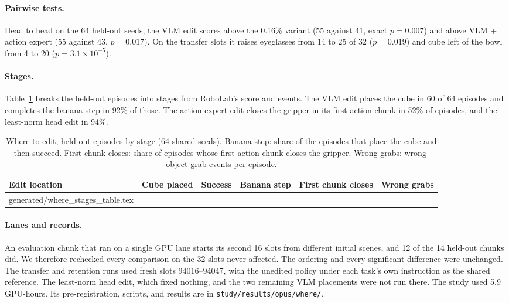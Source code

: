 \documentclass{article}
\makeatletter
\newcommand{\tabinput}[1]{\@@input #1 }
\makeatother
\begin{document}
\paragraph{Pairwise tests.} Head to head on the 64 held-out seeds, the VLM edit scores above the 0.16\% variant (55 against 41, exact $p=0.007$) and above VLM + action expert (55 against 43, $p=0.017$). On the transfer slots it raises eyeglasses from 14 to 25 of 32 ($p=0.019$) and cube left of the bowl from 4 to 20 ($p=3.1\times10^{-5}$).

\paragraph{Stages.} Table~\ref{tab:where-stages} breaks the held-out episodes into stages from RoboLab's score and events. The VLM edit places the cube in 60 of 64 episodes and completes the banana step in 92\% of those. The action-expert edit closes the gripper in its first action chunk in 52\% of episodes, and the least-norm head edit in 94\%.

\begin{table}[htbp]
\centering\small
\caption{Where to edit, held-out episodes by stage (64 shared seeds). Banana step: share of the episodes that place the cube and then succeed. First chunk closes: share of episodes whose first action chunk closes the gripper. Wrong grabs: wrong-object grab events per episode.}
\label{tab:where-stages}
\setlength{\tabcolsep}{4pt}
\begin{tabular}{@{}lrrrrr@{}}
\toprule
Edit location & Cube placed & Success & Banana step & First chunk closes & Wrong grabs\\
\midrule
\tabinput{generated/where_stages_table.tex}
\bottomrule
\end{tabular}
\end{table}

\paragraph{Lanes and records.} An evaluation chunk that ran on a single GPU lane starts its second 16 slots from different initial scenes, and 12 of the 14 held-out chunks did. We therefore rechecked every comparison on the 32 slots never affected. The ordering and every significant difference were unchanged. The transfer and retention runs used fresh slots 94016--94047, with the unedited policy under each task's own instruction as the shared reference. The least-norm head edit, which fixed nothing, and the two remaining VLM placements were not run there. The study used 5.9 GPU-hours. Its pre-registration, scripts, and results are in \texttt{study/results/opus/where/}.
\end{document}
